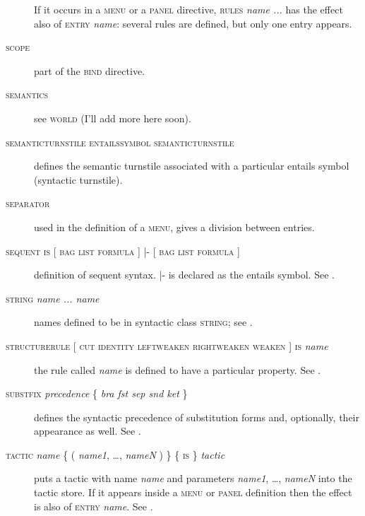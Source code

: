 \begin{description}
If it occurs in a \textsc{menu} or a \textsc{panel} directive, \textsc{rules} \textit{name ...} has the effect also of \textsc{entry} \textit{name}: several rules are defined, but only one entry appears.

\item[\textsc{scope}] part of the \textsc{bind} directive.

\item[\textsc{semantics}] see \textsc{world} (I'll add more here soon).

\item[\textsc{semanticturnstile} \textsc{entailssymbol} \textsc{semanticturnstile}] defines the semantic turnstile associated with a particular entails symbol (syntactic turnstile).

\item[\textsc{separator}] used in the definition of a \textsc{menu}, gives a division between entries. %

\item[\textsc{sequent is} {[} \textsc{bag} {\textbar} \textsc{list} {\textbar} \textsc{formula} {]} |- {[} \textsc{bag} {\textbar} \textsc{list} {\textbar} \textsc{formula} {]}] definition of sequent syntax. |- is declared as the entails symbol. See .

\item[\textsc{string} \textit{name ... name}] names defined to be in syntactic class \textsc{string}; see .

\item[\textsc{structurerule} {[} \textsc{cut} {\textbar} \textsc{identity} {\textbar} \textsc{leftweaken} {\textbar} \textsc{rightweaken} {\textbar} \textsc{weaken} {]} \textsc{is} \textit{name}] the rule called \textit{name} is defined to have a particular property. See .

\item[\textsc{substfix} \textit{precedence} \{ \textit{bra fst sep snd ket} \}] defines the syntactic precedence of substitution forms and, optionally, their appearance as well. See .

\item[\textsc{tactic} \textit{name} \{ ( \textit{name1}, \dots, \textit{nameN} ) \} \{ \textsc{is} \} \textit{tactic}] puts a tactic with name \textit{name} and parameters \textit{name1}, \dots, \textit{nameN} into the tactic store. If it appears inside a \textsc{menu} or \textsc{panel} definition then the effect is also of \textsc{entry} \textit{name}.%
See .


\end{description}
